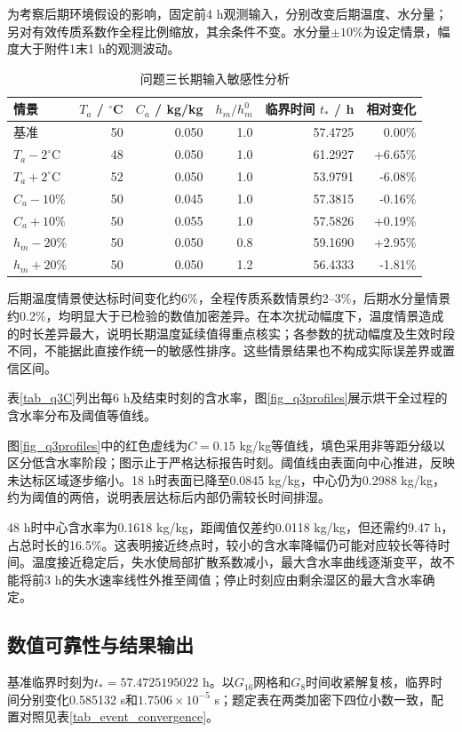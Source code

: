 为考察后期环境假设的影响，固定前4 h观测输入，分别改变后期温度、水分量；另对有效传质系数作全程比例缩放，其余条件不变。水分量$\pm10\%$为设定情景，幅度大于附件1末1 h的观测波动。
\begin{table}[H]
\centering\small
\caption{问题三长期输入敏感性分析}
\label{tab_q3_sensitivity}
\begin{tabular}{lrrrrr}
\toprule
情景 & $T_a$ / $^\circ$C & $C_a$ / kg/kg & $h_m/h_m^0$ & 临界时间 $t_*$ / h & 相对变化 \\
\midrule
基准 & 50 & 0.050 & 1.0 & 57.4725 & 0.00\% \\
$T_a-2^\circ$C & 48 & 0.050 & 1.0 & 61.2927 & +6.65\% \\
$T_a+2^\circ$C & 52 & 0.050 & 1.0 & 53.9791 & -6.08\% \\
$C_a-10\%$ & 50 & 0.045 & 1.0 & 57.3815 & -0.16\% \\
$C_a+10\%$ & 50 & 0.055 & 1.0 & 57.5826 & +0.19\% \\
$h_m-20\%$ & 50 & 0.050 & 0.8 & 59.1690 & +2.95\% \\
$h_m+20\%$ & 50 & 0.050 & 1.2 & 56.4333 & -1.81\% \\
\bottomrule
\end{tabular}
\end{table}
后期温度情景使达标时间变化约6\%，全程传质系数情景约2--3\%，后期水分量情景约0.2\%，均明显大于已检验的数值加密差异。在本次扰动幅度下，温度情景造成的时长差异最大，说明长期温度延续值得重点核实；各参数的扰动幅度及生效时段不同，不能据此直接作统一的敏感性排序。这些情景结果也不构成实际误差界或置信区间。

表\ref{tab_q3C}列出每6 h及结束时刻的含水率，图\ref{fig_q3profiles}展示烘干全过程的含水率分布及阈值等值线。


图\ref{fig_q3profiles}中的红色虚线为$C=0.15$ kg/kg等值线，填色采用非等距分级以区分低含水率阶段；图示止于严格达标报告时刻。阈值线由表面向中心推进，反映未达标区域逐步缩小。18 h时表面已降至0.0845 kg/kg，中心仍为0.2988 kg/kg，约为阈值的两倍，说明表层达标后内部仍需较长时间排湿。

48 h时中心含水率为0.1618 kg/kg，距阈值仅差约0.0118 kg/kg，但还需约9.47 h，占总时长的16.5\%。这表明接近终点时，较小的含水率降幅仍可能对应较长等待时间。温度接近稳定后，失水使局部扩散系数减小，最大含水率曲线逐渐变平，故不能将前3 h的失水速率线性外推至阈值；停止时刻应由剩余湿区的最大含水率确定。
\FloatBarrier

\subsection{数值可靠性与结果输出}\label{sec_q3_numerical}
基准临界时刻为$t_*=57.4725195022$ h。以$G_{16}$网格和$G_8$时间收紧解复核，临界时间分别变化0.585132 s和$1.7506\times10^{-5}$ s；题定表在两类加密下四位小数一致，配置对照见表\ref{tab_event_convergence}。

